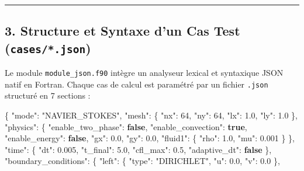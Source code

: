 \documentclass[
  french,
]{article}
\newenvironment{Shaded}{}{}
\newcommand{\DataTypeTok}[1]{\textcolor[rgb]{0.56,0.13,0.00}{#1}}
\newcommand{\DecValTok}[1]{\textcolor[rgb]{0.25,0.63,0.44}{#1}}
\newcommand{\FloatTok}[1]{\textcolor[rgb]{0.25,0.63,0.44}{#1}}
\newcommand{\FunctionTok}[1]{\textcolor[rgb]{0.02,0.16,0.49}{#1}}
\newcommand{\KeywordTok}[1]{\textcolor[rgb]{0.00,0.44,0.13}{\textbf{#1}}}
\newcommand{\StringTok}[1]{\textcolor[rgb]{0.25,0.44,0.63}{#1}}
\begin{document}
\begin{center}\rule{0.5\linewidth}{0.5pt}\end{center}

\subsection{\texorpdfstring{3. Structure et Syntaxe d'un Cas Test
(\texttt{cases/*.json})}{3. Structure et Syntaxe d'un Cas Test (cases/*.json)}}\label{structure-et-syntaxe-dun-cas-test-cases.json}

Le module \texttt{module\_json.f90} intègre un analyseur lexical et
syntaxique JSON natif en Fortran. Chaque cas de calcul est paramétré par
un fichier \texttt{.json} structuré en 7 sections :

\begin{Shaded}
\begin{Highlighting}[]
\FunctionTok{\{}
  \DataTypeTok{"mode"}\FunctionTok{:} \StringTok{"NAVIER\_STOKES"}\FunctionTok{,}
  \DataTypeTok{"mesh"}\FunctionTok{:} \FunctionTok{\{}
    \DataTypeTok{"nx"}\FunctionTok{:} \DecValTok{64}\FunctionTok{,}
    \DataTypeTok{"ny"}\FunctionTok{:} \DecValTok{64}\FunctionTok{,}
    \DataTypeTok{"lx"}\FunctionTok{:} \FloatTok{1.0}\FunctionTok{,}
    \DataTypeTok{"ly"}\FunctionTok{:} \FloatTok{1.0}
  \FunctionTok{\},}
  \DataTypeTok{"physics"}\FunctionTok{:} \FunctionTok{\{}
    \DataTypeTok{"enable\_two\_phase"}\FunctionTok{:} \KeywordTok{false}\FunctionTok{,}
    \DataTypeTok{"enable\_convection"}\FunctionTok{:} \KeywordTok{true}\FunctionTok{,}
    \DataTypeTok{"enable\_energy"}\FunctionTok{:} \KeywordTok{false}\FunctionTok{,}
    \DataTypeTok{"gx"}\FunctionTok{:} \FloatTok{0.0}\FunctionTok{,}
    \DataTypeTok{"gy"}\FunctionTok{:} \FloatTok{0.0}\FunctionTok{,}
    \DataTypeTok{"fluid1"}\FunctionTok{:} \FunctionTok{\{} \DataTypeTok{"rho"}\FunctionTok{:} \FloatTok{1.0}\FunctionTok{,} \DataTypeTok{"mu"}\FunctionTok{:} \FloatTok{0.001} \FunctionTok{\}}
  \FunctionTok{\},}
  \DataTypeTok{"time"}\FunctionTok{:} \FunctionTok{\{}
    \DataTypeTok{"dt"}\FunctionTok{:} \FloatTok{0.005}\FunctionTok{,}
    \DataTypeTok{"t\_final"}\FunctionTok{:} \FloatTok{5.0}\FunctionTok{,}
    \DataTypeTok{"cfl\_max"}\FunctionTok{:} \FloatTok{0.5}\FunctionTok{,}
    \DataTypeTok{"adaptive\_dt"}\FunctionTok{:} \KeywordTok{false}
  \FunctionTok{\},}
  \DataTypeTok{"boundary\_conditions"}\FunctionTok{:} \FunctionTok{\{}
    \DataTypeTok{"left"}\FunctionTok{:}   \FunctionTok{\{} \DataTypeTok{"type"}\FunctionTok{:} \StringTok{"DIRICHLET"}\FunctionTok{,} \DataTypeTok{"u"}\FunctionTok{:} \FloatTok{0.0}\FunctionTok{,} \DataTypeTok{"v"}\FunctionTok{:} \FloatTok{0.0} \FunctionTok{\},}

\end{Highlighting}
\end{Shaded}
\end{document}
